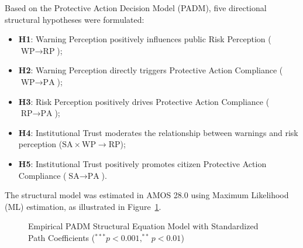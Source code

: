 Based on the Protective Action Decision Model (PADM), five directional structural hypotheses were formulated:
\begin{itemize}
    \item \textbf{H1}: Warning Perception positively influences public Risk Perception ($\text{WP} \to \text{RP}$);
    \item \textbf{H2}: Warning Perception directly triggers Protective Action Compliance ($\text{WP} \to \text{PA}$);
    \item \textbf{H3}: Risk Perception positively drives Protective Action Compliance ($\text{RP} \to \text{PA}$);
    \item \textbf{H4}: Institutional Trust moderates the relationship between warnings and risk perception ($\text{SA} \times \text{WP} \to \text{RP}$);
    \item \textbf{H5}: Institutional Trust positively promotes citizen Protective Action Compliance ($\text{SA} \to \text{PA}$).
\end{itemize}

The structural model was estimated in AMOS 28.0 using Maximum Likelihood (ML) estimation, as illustrated in Figure~\ref{fig:sem_path_model}.

\begin{figure}[H]
\centering
{}
\caption{Empirical PADM Structural Equation Model with Standardized Path Coefficients ($^{***}p < 0.001, ^{**}p < 0.01$)}
\label{fig:sem_path_model}
\end{figure}

